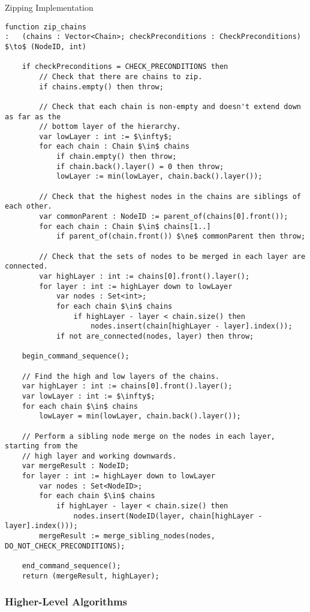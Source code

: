 \begin{stulisting}[p]
\caption{Zipping Implementation}
\label{code:ipfs-forest-zipchains}
\begin{lstlisting}[style=Default]
function zip_chains
:	(chains : Vector<Chain>; checkPreconditions : CheckPreconditions) $\to$ (NodeID, int)

	if checkPreconditions = CHECK_PRECONDITIONS then
		// Check that there are chains to zip.
		if chains.empty() then throw;

		// Check that each chain is non-empty and doesn't extend down as far as the
		// bottom layer of the hierarchy.
		var lowLayer : int := $\infty$;
		for each chain : Chain $\in$ chains
			if chain.empty() then throw;
			if chain.back().layer() = 0 then throw;
			lowLayer := min(lowLayer, chain.back().layer());

		// Check that the highest nodes in the chains are siblings of each other.
		var commonParent : NodeID := parent_of(chains[0].front());
		for each chain : Chain $\in$ chains[1..]
			if parent_of(chain.front()) $\ne$ commonParent then throw;

		// Check that the sets of nodes to be merged in each layer are connected.
		var highLayer : int := chains[0].front().layer();
		for layer : int := highLayer down to lowLayer
			var nodes : Set<int>;
			for each chain $\in$ chains
				if highLayer - layer < chain.size() then
					nodes.insert(chain[highLayer - layer].index());
			if not are_connected(nodes, layer) then throw;

	begin_command_sequence();

	// Find the high and low layers of the chains.
	var highLayer : int := chains[0].front().layer();
	var lowLayer : int := $\infty$;
	for each chain $\in$ chains
		lowLayer = min(lowLayer, chain.back().layer());

	// Perform a sibling node merge on the nodes in each layer, starting from the
	// high layer and working downwards.
	var mergeResult : NodeID;
	for layer : int := highLayer down to lowLayer
		var nodes : Set<NodeID>;
		for each chain $\in$ chains
			if highLayer - layer < chain.size() then
				nodes.insert(NodeID(layer, chain[highLayer - layer].index()));
		mergeResult := merge_sibling_nodes(nodes, DO_NOT_CHECK_PRECONDITIONS);

	end_command_sequence();
	return (mergeResult, highLayer);
\end{lstlisting}
\end{stulisting}

\subsubsection{Higher-Level Algorithms}


